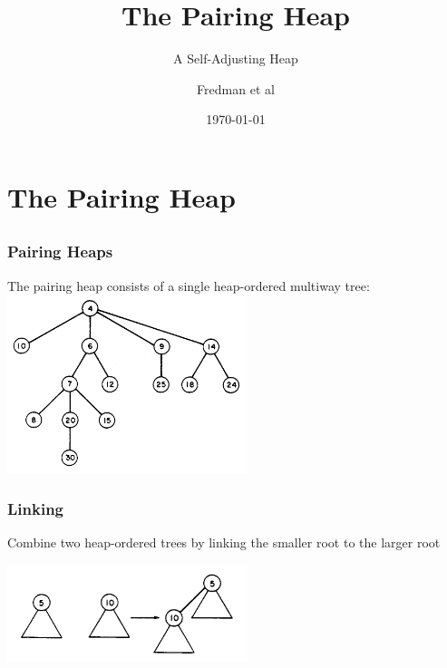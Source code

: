 \documentclass{beamer}
\title{The Pairing Heap}
\subtitle{A Self-Adjusting Heap}
\author{Fredman et al}
\date{\today}
\begin{document}
\lstset{basicstyle=\footnotesize\ttfamily}
\begin{frame}
  \titlepage
\end{frame}
 
\section{The Pairing Heap}
\subsection{}
\begin{frame}[fragile]
\frametitle{Pairing Heaps}

The pairing heap consists of a single heap-ordered multiway tree:\\

\includegraphics[width=7cm]{fig1.png}

\end{frame}

\begin{frame}
\frametitle{Linking}

Combine two heap-ordered trees by linking the smaller root to the larger root

\includegraphics[width=7cm]{fig2.png}

\end{frame}
 
\end{document}
